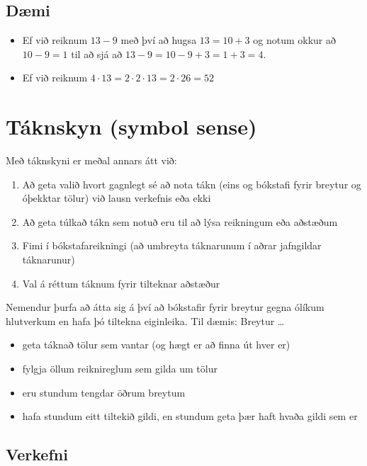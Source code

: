 \documentclass[
  icelandic,
]{book}
\providecommand{\tightlist}{%
  \setlength{\itemsep}{0pt}\setlength{\parskip}{0pt}}
\begin{document}
\subsection{Dæmi}\label{duxe6mi}

\begin{itemize}
\tightlist
\item
  Ef við reiknum \(13-9\) með því að hugsa \(13 = 10 + 3\) og notum okkur að \(10-9=1\) til að sjá að \(13-9 = 10 - 9 + 3 = 1 + 3 = 4\).
\item
  Ef við reiknum \(4 \cdot 13 = 2 \cdot 2 \cdot 13 = 2 \cdot 26 = 52\)
\end{itemize}

\section{Táknskyn (symbol sense)}\label{tuxe1knskyn-symbol-sense}

Með táknskyni er meðal annars átt við:

\begin{enumerate}
\def\labelenumi{\alph{enumi}.}
\tightlist
\item
  Að geta valið hvort gagnlegt sé að nota tákn (eins og bókstafi fyrir breytur og óþekktar tölur) við lausn verkefnis eða ekki
\item
  Að geta túlkað tákn sem notuð eru til að lýsa reikningum eða aðstæðum
\item
  Fimi í bókstafareikningi (að umbreyta táknarunum í aðrar jafngildar táknarunur)
\item
  Val á réttum táknum fyrir tilteknar aðstæður
\end{enumerate}

Nemendur þurfa að átta sig á því að bókstafir fyrir breytur gegna ólíkum hlutverkum en hafa þó tiltekna eiginleika. Til dæmis: Breytur \ldots{}

\begin{itemize}
\tightlist
\item
  geta táknað tölur sem vantar (og hægt er að finna út hver er)
\item
  fylgja öllum reiknireglum sem gilda um tölur
\item
  eru stundum tengdar öðrum breytum
\item
  hafa stundum eitt tiltekið gildi, en stundum geta þær haft hvaða gildi sem er
\end{itemize}

\subsection{Verkefni}\label{verkefni-1}
\end{document}
